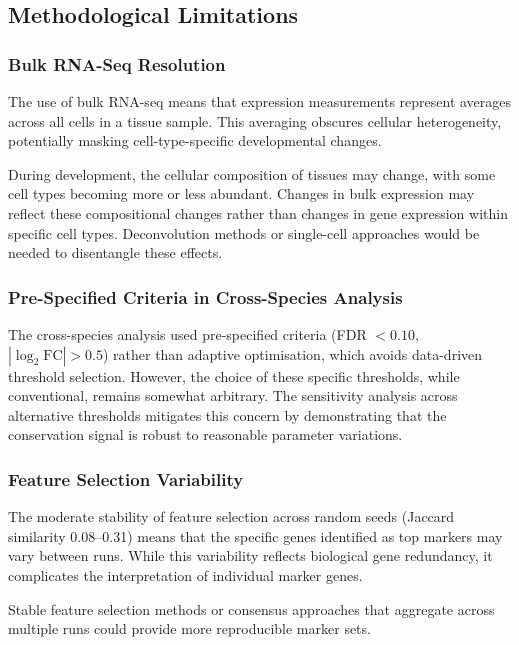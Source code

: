 \subsection{Methodological Limitations}

\subsubsection{Bulk RNA-Seq Resolution}

The use of bulk RNA-seq means that expression measurements represent averages across all cells in a tissue sample. This averaging obscures cellular heterogeneity, potentially masking cell-type-specific developmental changes.

During development, the cellular composition of tissues may change, with some cell types becoming more or less abundant. Changes in bulk expression may reflect these compositional changes rather than changes in gene expression within specific cell types. Deconvolution methods or single-cell approaches would be needed to disentangle these effects.

\subsubsection{Pre-Specified Criteria in Cross-Species Analysis}

The cross-species analysis used pre-specified criteria (FDR $< 0.10$, $|\log_2\text{FC}| > 0.5$) rather than adaptive optimisation, which avoids data-driven threshold selection. However, the choice of these specific thresholds, while conventional, remains somewhat arbitrary. The sensitivity analysis across alternative thresholds mitigates this concern by demonstrating that the conservation signal is robust to reasonable parameter variations.

\subsubsection{Feature Selection Variability}

The moderate stability of feature selection across random seeds (Jaccard similarity 0.08--0.31) means that the specific genes identified as top markers may vary between runs. While this variability reflects biological gene redundancy, it complicates the interpretation of individual marker genes.

Stable feature selection methods or consensus approaches that aggregate across multiple runs could provide more reproducible marker sets.


